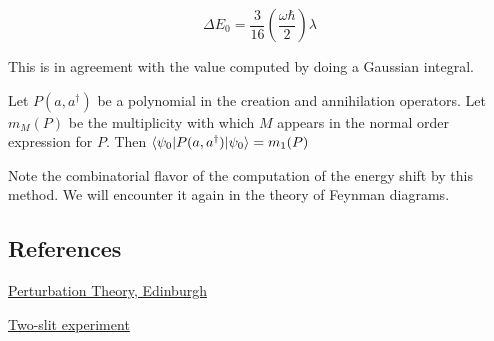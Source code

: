 \begin{equation}
\Delta E_0 = \frac{3}{16}\left( \frac{\omega \hbar}{2}\right)  \lambda
\end{equation}

This is in agreement with the value computed by doing a Gaussian integral.

\begin{remark} 
Let $P(a,a^\dagger)$ be a polynomial in the creation and annihilation operators.  Let $m_M(P)$ be the multiplicity with which $M$ appears in the normal order expression for $P$. Then $\langle \psi_0 | P(a,a^\dagger) | \psi_0 \rangle = m_1(P)$
\end{remark}

Note the combinatorial flavor of the computation of the energy shift by this method.  We will encounter it again in the theory of Feynman diagrams.

\subsection{References}

\href{http://www2.ph.ed.ac.uk/~ldeldebb/docs/QM/lect17.pdf}{Perturbation Theory, Edinburgh}

\href{http://www.cavendishscience.org/phys/tyoung/tyoung.htm}{Two-slit experiment}